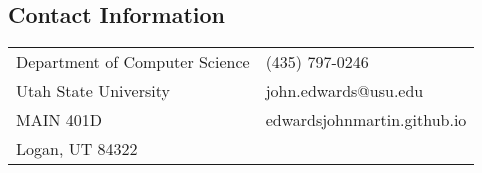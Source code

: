 \documentclass[margin,line]{res}
\begin{document}

\begin{resume}
\section{\sc Contact Information}
\vspace{.05in}


\begin{tabular}{@{}p{3.3in}p{3in}}
Department of Computer Science & (435) 797-0246 \\
Utah State University   & john.edwards@usu.edu \\
MAIN 401D      &  edwardsjohnmartin.github.io \\
Logan, UT 84322          &
\end{tabular}


\end{resume}
\end{document}

